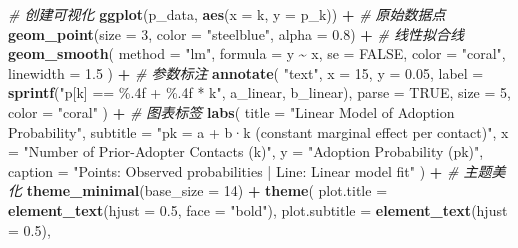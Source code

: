 \documentclass[
]{article}
\newenvironment{Shaded}{\begin{snugshade}}{\end{snugshade}}
\newcommand{\AttributeTok}[1]{\textcolor[rgb]{0.13,0.29,0.53}{#1}}
\newcommand{\CommentTok}[1]{\textcolor[rgb]{0.56,0.35,0.01}{\textit{#1}}}
\newcommand{\ConstantTok}[1]{\textcolor[rgb]{0.56,0.35,0.01}{#1}}
\newcommand{\DecValTok}[1]{\textcolor[rgb]{0.00,0.00,0.81}{#1}}
\newcommand{\FloatTok}[1]{\textcolor[rgb]{0.00,0.00,0.81}{#1}}
\newcommand{\FunctionTok}[1]{\textcolor[rgb]{0.13,0.29,0.53}{\textbf{#1}}}
\newcommand{\NormalTok}[1]{#1}
\newcommand{\SpecialCharTok}[1]{\textcolor[rgb]{0.81,0.36,0.00}{\textbf{#1}}}
\newcommand{\StringTok}[1]{\textcolor[rgb]{0.31,0.60,0.02}{#1}}
\begin{document}
\begin{Shaded}
\begin{Highlighting}[]
\CommentTok{\# 创建可视化}
\FunctionTok{ggplot}\NormalTok{(p\_data, }\FunctionTok{aes}\NormalTok{(}\AttributeTok{x =}\NormalTok{ k, }\AttributeTok{y =}\NormalTok{ p\_k)) }\SpecialCharTok{+}
  \CommentTok{\# 原始数据点}
  \FunctionTok{geom\_point}\NormalTok{(}\AttributeTok{size =} \DecValTok{3}\NormalTok{, }\AttributeTok{color =} \StringTok{"steelblue"}\NormalTok{, }\AttributeTok{alpha =} \FloatTok{0.8}\NormalTok{) }\SpecialCharTok{+}
  \CommentTok{\# 线性拟合线}
  \FunctionTok{geom\_smooth}\NormalTok{(}
    \AttributeTok{method =} \StringTok{"lm"}\NormalTok{, }
    \AttributeTok{formula =}\NormalTok{ y }\SpecialCharTok{\textasciitilde{}}\NormalTok{ x,}
    \AttributeTok{se =} \ConstantTok{FALSE}\NormalTok{, }
    \AttributeTok{color =} \StringTok{"coral"}\NormalTok{,}
    \AttributeTok{linewidth =} \FloatTok{1.5}
\NormalTok{  ) }\SpecialCharTok{+}
  \CommentTok{\# 参数标注}
  \FunctionTok{annotate}\NormalTok{(}
    \StringTok{"text"}\NormalTok{,}
    \AttributeTok{x =} \DecValTok{15}\NormalTok{,}
    \AttributeTok{y =} \FloatTok{0.05}\NormalTok{,}
    \AttributeTok{label =} \FunctionTok{sprintf}\NormalTok{(}\StringTok{"p[k] == \%.4f + \%.4f * k"}\NormalTok{, }
\NormalTok{                   a\_linear, }
\NormalTok{                   b\_linear),}
    \AttributeTok{parse =} \ConstantTok{TRUE}\NormalTok{,}
    \AttributeTok{size =} \DecValTok{5}\NormalTok{,}
    \AttributeTok{color =} \StringTok{"coral"}
\NormalTok{  ) }\SpecialCharTok{+}
  \CommentTok{\# 图表标签}
  \FunctionTok{labs}\NormalTok{(}
    \AttributeTok{title =} \StringTok{"Linear Model of Adoption Probability"}\NormalTok{,}
    \AttributeTok{subtitle =} \StringTok{"pk = a + b·k (constant marginal effect per contact)"}\NormalTok{,}
    \AttributeTok{x =} \StringTok{"Number of Prior{-}Adopter Contacts (k)"}\NormalTok{,}
    \AttributeTok{y =} \StringTok{"Adoption Probability (pk)"}\NormalTok{,}
    \AttributeTok{caption =} \StringTok{"Points: Observed probabilities | Line: Linear model fit"}
\NormalTok{  ) }\SpecialCharTok{+}
  \CommentTok{\# 主题美化}
  \FunctionTok{theme\_minimal}\NormalTok{(}\AttributeTok{base\_size =} \DecValTok{14}\NormalTok{) }\SpecialCharTok{+}
  \FunctionTok{theme}\NormalTok{(}
    \AttributeTok{plot.title =} \FunctionTok{element\_text}\NormalTok{(}\AttributeTok{hjust =} \FloatTok{0.5}\NormalTok{, }\AttributeTok{face =} \StringTok{"bold"}\NormalTok{),}
    \AttributeTok{plot.subtitle =} \FunctionTok{element\_text}\NormalTok{(}\AttributeTok{hjust =} \FloatTok{0.5}\NormalTok{),}

\end{Highlighting}
\end{Shaded}
\end{document}
